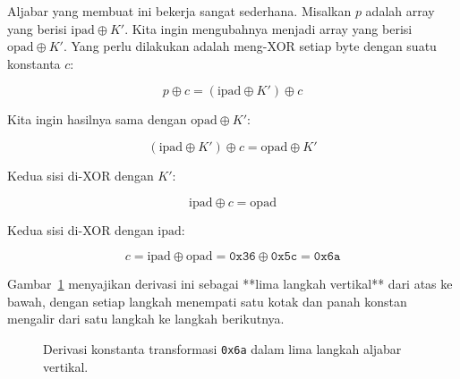 \documentclass[11pt,a4paper]{article}
\begin{document}
Aljabar yang membuat ini bekerja sangat sederhana. Misalkan $p$ adalah array yang berisi $\text{ipad} \oplus K'$. Kita ingin mengubahnya menjadi array yang berisi $\text{opad} \oplus K'$. Yang perlu dilakukan adalah meng-XOR setiap byte dengan suatu konstanta $c$:

\[
	p \oplus c = (\text{ipad} \oplus K') \oplus c
\]

Kita ingin hasilnya sama dengan $\text{opad} \oplus K'$:

\[
	(\text{ipad} \oplus K') \oplus c = \text{opad} \oplus K'
\]

Kedua sisi di-XOR dengan $K'$:

\[
	\text{ipad} \oplus c = \text{opad}
\]

Kedua sisi di-XOR dengan $\text{ipad}$:

\[
	c = \text{ipad} \oplus \text{opad} = \texttt{0x36} \oplus \texttt{0x5c} = \texttt{0x6a}
\]

Gambar~\ref{fig:0x6a-derivation} menyajikan derivasi ini sebagai **lima langkah vertikal** dari atas ke bawah, dengan setiap langkah menempati satu kotak dan panah konstan mengalir dari satu langkah ke langkah berikutnya.

\begin{figure}[H]
	\centering
	\caption{Derivasi konstanta transformasi \texttt{0x6a} dalam lima langkah aljabar vertikal.}
	\label{fig:0x6a-derivation}
\end{figure}
\end{document}
